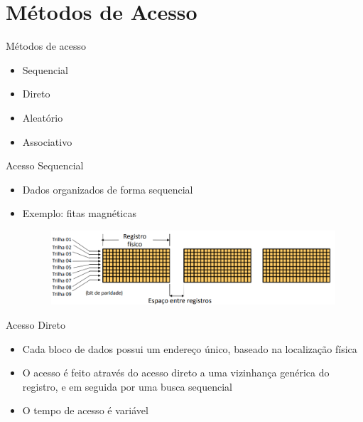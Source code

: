 \documentclass[aspectratio=169,
				xcolor=table]{beamer}
\begin{document}
	\section{Métodos de Acesso}
	\begin{frame}{Métodos de acesso}
		\begin{itemize}
			\item Sequencial
			\vspace{1em}
			\item Direto
			\vspace{1em}
			\item Aleatório
			\vspace{1em}
			\item Associativo
		\end{itemize}
	\end{frame}
	
	\begin{frame}{Acesso Sequencial}
		\begin{itemize}
			\item Dados organizados de forma sequencial
			\vspace{1em}
			\item Exemplo: fitas magnéticas
					\begin{figure}[hbtp]
			\centering
			\includegraphics[height=0.4\textheight, keepaspectratio]{../figs/cap07/acessodireto}
		\end{figure}
		\end{itemize}
	\end{frame}
	
	\begin{frame}{Acesso Direto}
		\begin{itemize}
			\item Cada bloco de dados possui um endereço único, baseado na localização física
			\vspace{1em}
			\item O acesso é feito através do acesso direto a uma vizinhança genérica do registro, e em seguida por uma busca sequencial 
			\vspace{1em}
			\item O tempo de acesso é variável
		\end{itemize}
	\end{frame}
	
\end{document}
